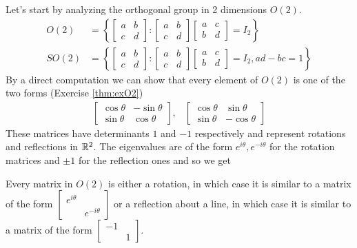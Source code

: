 Let's start by analyzing the orthogonal group in 2 dimensions $O(2)$.
\begin{align}
	O(2)
	&=
	\left\{ \begin{bmatrix} a & b \\ c & d \end{bmatrix} : \begin{bmatrix} a & b \\ c & d \end{bmatrix} \begin{bmatrix} a & c \\ b & d \end{bmatrix} = I_2\right\} \\
	SO(2)
	&=
	\left\{ \begin{bmatrix} a & b \\ c & d \end{bmatrix} : \begin{bmatrix} a & b \\ c & d \end{bmatrix} \begin{bmatrix} a & c \\ b & d \end{bmatrix} = I_2, ad-bc = 1 \right\}
\end{align}
By a direct computation we can show that every element of $O(2)$ is one of the two forms (Exercise \ref{thm:exO2})
\begin{align}
	\label{eq:O2}
	\begin{bmatrix} \cos \theta & -\sin \theta \\ \sin \theta & \cos \theta \end{bmatrix}, & \begin{bmatrix} \cos \theta & \sin \theta \\ \sin \theta & -\cos \theta \end{bmatrix}
\end{align}
These matrices have determinants $1$ and $-1$ respectively and represent rotations and reflections in $\mathbb{R}^2$. The eigenvalues are of the form $e^{i\theta}, e^{-i\theta}$ for the rotation matrices and $\pm 1$ for the reflection ones and so we get

\begin{proposition}
	Every matrix in $O(2)$ is either a rotation, in which case it is similar to a matrix of the form $\begin{bmatrix} e^{i\theta} & \\ & e^{-i\theta} \end{bmatrix}$ or a reflection about a line, in which case it is similar to a matrix of the form $\begin{bmatrix} -1 & \\ & 1 \end{bmatrix}$.
\end{proposition}


